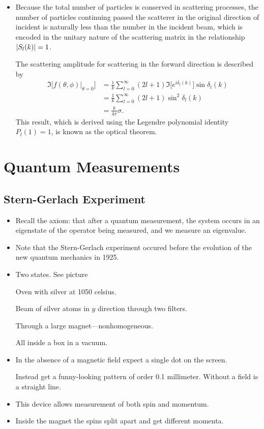 \documentclass[11pt, a4paper]{article}
\begin{document}
\begin{itemize}
    \item Because the total number of particles is conserved in scattering processes, the number of particles continuing passed the scatterer in the original direction of incident is naturally less than the number in the incident beam, which is encoded in the unitary nature of the scattering matrix in the relationship $ \abs{S_{l}(k)} = 1 $. 

    The scattering amplitude for scattering in the forward direction is described by
    \begin{align*}
        \Im \big[ f(\theta, \phi)\big |_{\theta = 0} \big] &= \frac{1}{k} \sum_{l = 0}^{\infty} (2l + 1) \Im \big[ e^{i\delta_{l}(k)} \big] \sin \delta_{l}(k) \\
        & = \frac{1}{k} \sum_{l = 0}^{\infty} (2l + 1) \sin^{2} \delta_{l}(k)\\
        &= \frac{k}{4\pi} \sigma.
    \end{align*}
    This result, which is derived using the Legendre polynomial identity $ P_{l}(1) = 1 $, is known as the optical theorem. 
    
    
\end{itemize}

\section{Quantum Measurements}
\subsection{Stern-Gerlach Experiment}

\begin{itemize}
    \item Recall the axiom: that after a quantum measurement, the system occurs in an eigenstate of the operator being measured, and we measure an eigenvalue.

    \item Note that the Stern-Gerlach experiment occured before the evolution of the new quantum mechanics in 1925. 

    \item Two states. See picture

    Oven with silver at 1050 celsius. 

    Beam of silver atoms in $ y $ direction through two filters.

    Through a large magnet---nonhomogeneous. 

    All inside a box in a vacuum. 

    \item In the absence of a magnetic field expect a single dot on the screen. 

    Instead get a funny-looking pattern of order 0.1 millimeter. Without a field is a straight line. 

    \item This device allows measurement of both spin and momentum. 

    \item Inside the magnet the spins split apart and get different momenta. 
\end{itemize}
\end{document}
